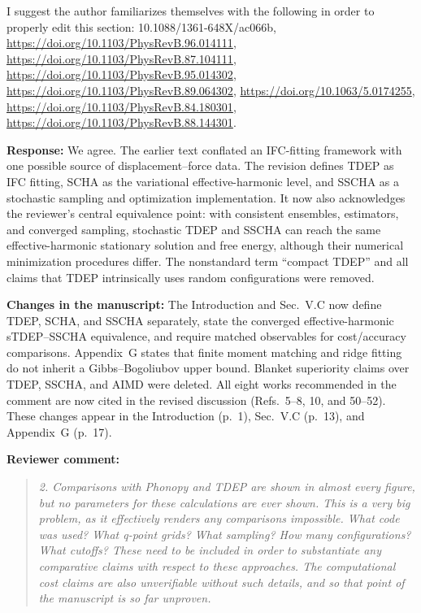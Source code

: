 \documentclass[11pt]{article}
\newcommand{\Question}[1]{\par\medskip\noindent\textbf{Reviewer comment:}\par\begin{quote}\itshape #1\end{quote}}
\newcommand{\Answer}[1]{\par\noindent\color{black}\normalfont\textbf{Response:} #1\par\smallskip}
\newcommand{\Change}[1]{\par\noindent\color{revisionblue}\normalfont\textbf{Changes in the manuscript:} #1\par\color{black}\medskip}
\begin{document}
{I suggest the author familiarizes themselves with the following in order to properly edit this section: 10.1088/1361-648X/ac066b, \url{https://doi.org/10.1103/PhysRevB.96.014111}, \url{https://doi.org/10.1103/PhysRevB.87.104111}, \url{https://doi.org/10.1103/PhysRevB.95.014302}, \url{https://doi.org/10.1103/PhysRevB.89.064302}, \url{https://doi.org/10.1063/5.0174255}, \url{https://doi.org/10.1103/PhysRevB.84.180301}, \url{https://doi.org/10.1103/PhysRevB.88.144301}.}

\Answer{We agree. The earlier text conflated an IFC-fitting framework with one
possible source of displacement--force data. The revision defines TDEP as IFC
fitting, SCHA as the variational effective-harmonic level, and SSCHA as a
stochastic sampling and optimization implementation. It now also acknowledges
the reviewer's central equivalence point: with consistent ensembles, estimators,
and converged sampling, stochastic TDEP and SSCHA can reach the same
effective-harmonic stationary solution and free energy, although their numerical
minimization procedures differ. The nonstandard term ``compact TDEP'' and all
claims that TDEP intrinsically uses random configurations were removed.}

\Change{The Introduction and Sec.~V.C now define TDEP, SCHA, and SSCHA
separately, state the converged effective-harmonic sTDEP--SSCHA equivalence, and
require matched observables for cost/accuracy comparisons. Appendix~G states
that finite moment matching and ridge fitting do not inherit a
Gibbs--Bogoliubov upper bound. Blanket superiority claims over TDEP, SSCHA, and
AIMD were deleted. All eight works recommended in the comment are now cited in
the revised discussion (Refs.~5--8, 10, and 50--52). These changes appear in
the Introduction (p.~1), Sec.~V.C (p.~13), and Appendix~G (p.~17).}

\Question{2. Comparisons with Phonopy and TDEP are shown in almost every figure, but no parameters for these calculations are ever shown. This is a very big problem, as it effectively renders any comparisons impossible. What code was used? What q-point grids? What sampling? How many configurations? What cutoffs? These need to be included in order to substantiate any comparative claims with respect to these approaches. The computational cost claims are also unverifiable without such details, and so that point of the manuscript is so far unproven.}
\end{document}
